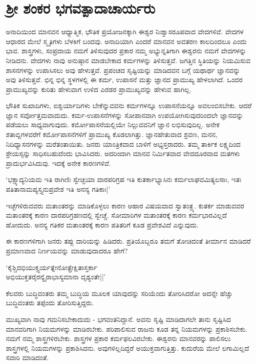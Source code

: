 \chapter{ಶ್ರೀ ಶಂಕರ ಭಗವತ್ಪಾದಾಚಾರ್ಯರು}\label{chap3}

ಅನಾದಿಯಿಂದ ಮಾನವನ ಆಧ್ಯಾತ್ಮಿಕ, ಭೌತಿಕ ಪ್ರಯೋಜನಕ್ಕಾಗಿ ಈಶ್ವರ ನಿಃಶ್ವಾಸರೂಪವಾದ ವೇದಗಳಿವೆ. ವೇದಗಳ ಆಧಾರದ ಮೇಲೆ ಸ್ಮೃತಿಗಳು ಬೆಳಕಿಗೆ ಬಂದವು. ಅನಾದಿಯಾಗಿ ಎಂದರೆ ಮಾನವನ ಅವತರಣ ಕಾಲದಿಂದಲೂ ಎಂದು ಭಾವ. ಶಾಸ್ತ್ರಗಳು, ಸಂಪ್ರದಾಯ ನಮಗೆ ತಿಳಿಸುವುದರ ಪ್ರಕಾರ ನಮ್ಮ ಅಭ್ಯುನ್ನತಿಗಾಗಿ ಈಶ್ವರನು ನಮಗೆ ವೇದಗಳನ್ನು ನೀಡಿದನು. ವೇದಗಳು ನಾವು ಅನುಷ್ಠಾನ ಮಾಡಬೇಕಾದ ಕರ್ಮಗಳನ್ನು ತಿಳಿಸುತ್ತವೆ. ಜಗತ್ತಿನ ಸ್ಥಿತಿಯನ್ನು ನಿಯಮಿಸುವ ಶಾಸನಗಳನ್ನು ಉಪಾಸಿಸಲು ಅವು ಹೇಳುತ್ತವೆ. ಪ್ರಪಂಚದ ಸೃಷ್ಟಿಯನ್ನು ಮಾಡಿದವನ ಬಗ್ಗೆ ಯಥಾರ್ಥ ಜ್ಞಾನವನ್ನು ಅವು ತಿಳಿಸುತ್ತವೆ. ಭಿನ್ನ ಭಿನ್ನ ಸ್ಥಳಗಳಲ್ಲಿ ಈ ಕರ್ಮ, ಉಪಾಸನೆ ಮತ್ತು ಜ್ಞಾನದ ಪ್ರಾಮುಖ್ಯ ಹೇಳಲಾಗಿದೆ. ಒಂದರ ಪ್ರಾಮುಖ್ಯವನ್ನು ಕುರಿತು ಹೇಳುವಾಗ ಉಳಿದ ಎರಡರ ಪ್ರಾಮುಖ್ಯವನ್ನು ಹೇಳುವ ಹಾಗಿಲ್ಲ.

ಭೌತಿಕ ಸುಖಾದಿಗಳು, ಐಶ್ವರ್ಯಾದಿಗಳು ಬೇಕೆನ್ನುವವನು ಕರ್ಮಗಳನ್ನೂ ಉಪಾಸನೆಯನ್ನೂ ಅವಲಂಬಿಸಬೇಕು. ಆದರೆ ಜ್ಞಾನ ಸರ್ವೋತ್ತಮವಾದುದು. ಕರ್ಮ-ಉಪಾಸನೆಗಳನ್ನು ಸೋಪಾನವಾಗಿ ಉಪಯೋಗಿಸುವುದರಿಂದಲೇ ಜ್ಞಾನವನ್ನು ಪಡೆಯಲು ಸಾಧ್ಯವಾಗುವುದು. ಕರ್ಮೋಪಾಸನೆಯಲ್ಲಿಯೇ ನಿಲ್ಲುವವನಿಗೆ ಜ್ಞಾನ ಲಭಿಸುವುದಿಲ್ಲ. ಅನೇಕ ಶತಾಬ್ದಿಗಳವರೆಗೆ ಕರ್ಮೋಪಾಸನೆಗಳಿಗೆ ಪ್ರಾಮುಖ್ಯ ಕೊಡಲಾಗಿತ್ತು. ಜ್ಞಾನಹೇತುವಾದ ಶ್ರವಣ, ಮನನ, ನಿದಿಧ್ಯಾಸನಗಳನ್ನು ಮರೆತಂತಾಯಿತು. ಜನರು ಯಾಂತ್ರಿಕವಾದ ಬಾಳಿಗೆ ಅಭ್ಯಸ್ತರಾದರು. ತಮ್ಮ ತಾರ್ಕಿಕ ಲಕ್ಷ್ಯದಿಂದ ಶ್ರೇಯಸ್ಸನ್ನು ಸಾಧಿಸಬಹುದೆಂದು ಭಾವಿಸಿದರು. ಅದರಿಂದಾಗಿ ಮಾನವ ನಿರ್ಮಿತವಾದ ವೇದದೂರವಾದ ಮತಗಳು ಪ್ರಾದುರ್ಭವಿಸಿದುವು. ಇದಕ್ಕೆ ಅನೇಕ ಕಾರಣಗಳಿವೆ.

`ಭಕ್ಷ್ಯಾದ್ಯನಿಯಮ ಇತಿ ರಾಗಿಣಿಃ ಸ್ವೇಚ್ಛಯಾ ದಾರಪರಿಗ್ರಹ ಇತಿ ಕುತರ್ಕಾಭ್ಯಾಸಿನಃ ಕರ್ಮಲಾಘವಮಿತ್ಯಲಸಾಃ, ಇತಃ ಪತಿತಾನಾಮಪ್ಯಸ್ತ್ಯನುಪ್ರವೇಶ ಇತಿ ಅನನ್ಯ ಗತಿಕಾಃ|'

ಇಚ್ಛೆಗಳಿರುವವರು ಮತಾಂತರನ್ನು ಮಾಡಿಕೊಳ್ಳಲು ಕಾರಣ ಆಹಾರ ವಿಷಯವಾದ ಸ್ವಾತಂತ್ರ್ಯ. ಕುತರ್ಕ ಮಾಡುವವರ ಮತಾಂತರಕ್ಕೆ ಕಾರಣ ದಾರಪರಿಗ್ರಹಣದಲ್ಲಿ ಸ್ವೇಚ್ಚೆ. ಸೋಮಾರಿಗಳ ಮತಾಂತರಕ್ಕೆ ಕಾರಣ ಕರ್ಮಭಾರವಿಲ್ಲದೆ ಹೋದುದು. ಅನನ್ಯ ಗತಿಕರ ಮತಾಂತರಕ್ಕೆ ಕಾರಣ ಪತಿತರಿಗೆ ಕೂಡ ಪ್ರವೇಶವಿದೆ ಎನ್ನುವುದು.

ಈ ಕಾರಣಗಳಿಗಾಗಿ ಜನರು ತಪ್ಪು ದಾರಿಯನ್ನು ಹಿಡಿದರು. ಪ್ರತಿಯೊಬ್ಬರೂ ತಮಗೆ ತೋಚಿದಂತೆ ತೀರ್ಮಾನ ಮಾಡಿದರೆ ಪ್ರಮಾಣವಾದ ನಿರ್ಣಯವನ್ನು ಮಾಡುವುದಾದರೂ ಹೇಗೆ?

\begin{shloka}
`ಕೈಶ್ಚಿದಭಿಯುಕ್ತ್ಯರ್ಯತ್ನೇನೋತ್ಪ್ರೇಕ್ಷಿತಾಸ್ತರ್ಕಾ\\
ಅಭಿಯುಕ್ತತರೈರನ್ಯೈರಾಭಾಸ್ಯಮಾನಾ ದೃಶ್ಯಂತೇ||'
\end{shloka}

ಕೆಲವರು ಬುದ್ಧಿವಂತರು ತಮ್ಮ ಬುದ್ಧಿಯ ಮೂಲಕ ಯಾವುದನ್ನು ಸರಿಯೆಂದು ತೋರಿಸಿದರೋ ಅದನ್ನೇ ಹೆಚ್ಚು ಬುದ್ಧಿವಂತರು ತಪ್ಪೆಂದು ತೋರಿಸುತ್ತಿದ್ದರು.

ಮುಖ್ಯವಾಗಿ ನಾವು ಗಮನಿಸಬೇಕಾದುದು - ಭಗವಂತನಿದ್ದಾನೆ. ಅವನು ಸೃಷ್ಟಿ ಮಾಡಿದಾಗಲೇ ತಾನು ಸೃಷ್ಟಿಸಿದ ಮಾನವರಿಗಾಗಿ ನಿಯಮಗಳನ್ನು ಮಾಡಿರಬೇಕು. ಪರಿಪಾಲಿಸುವ ರಾಜನು ಕೂಡ ತನ್ನ ನಿಯಮಗಳನ್ನು ಪ್ರಕಾಶಿಸಬೇಕು. ನಮಗೆ ನಮ್ಮ ಶಾಸ್ತ್ರಗಳಿರಬೇಕು. ಶಾಸ್ತ್ರಗಳ ಪ್ರಕಾರ ಕರ್ಮಫಲವಿರಬೇಕು. ಈಶ್ವರನು ಮಾನವರನ್ನು ಪಾಲಿಸಲು ಶಾಸ್ತ್ರಗಳಲ್ಲಿ ನಿಯಮಗಳನ್ನು ಪ್ರಕಾಶಿಸಿದನು. ಅವುಗಳಿಲ್ಲದಿದ್ದರೆ ಅಯುಕ್ತವಾಗುತ್ತಿತ್ತು. ಕುದುರೆಯ ಮೇಲೆ ಲಗಾಮಿಲ್ಲದೆ ಸವಾರಿ ಮಾಡಿದಂತೆ.

